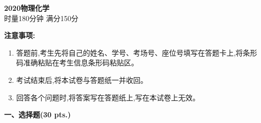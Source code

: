 \begin{center}
    {\LARGE \textbf{2020物理化学}} \\[2ex]
    {\large 时量180分钟 \quad 满分150分}
\end{center}

\vspace{0.5cm}
\noindent\textbf{注意事项:}
\begin{enumerate}[label=\arabic*., parsep=0pt, itemsep=0pt]
    \item 答题前,考生先将自己的姓名、学号、考场号、座位号填写在答题卡上,将条形码准确粘贴在考生信息条形码粘贴区。
    \item 考试结束后,将本试卷与答题纸一并收回。
    \item 回答各个问题时,将答案写在答题纸上,写在本试卷上无效。
\end{enumerate}

\vspace{0.5cm}
\noindent\textbf{一、选择题(30 pts.)}

